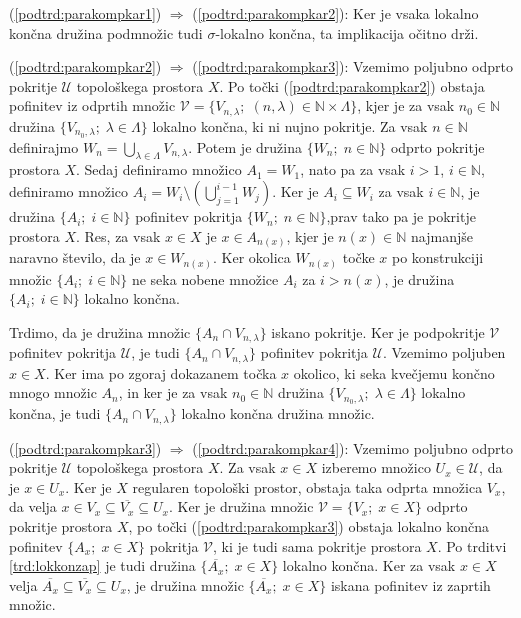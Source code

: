 \documentclass[mat1]{fmfdelo}
\newcommand{\N}{\mathbb N}
\newcommand{\Ucurl}{\mathcal{U}}
\newcommand{\closure}[1]{\overline{#1}}
\begin{document}
\begin{dokaz}
(\ref{podtrd:parakompkar1}) $\Rightarrow$ (\ref{podtrd:parakompkar2}):
Ker je vsaka lokalno končna družina podmnožic tudi $\sigma$-lokalno končna, ta implikacija očitno drži.

(\ref{podtrd:parakompkar2}) $\Rightarrow$ (\ref{podtrd:parakompkar3}):
Vzemimo poljubno odprto pokritje $\Ucurl$ topološkega prostora $X$. Po točki (\ref{podtrd:parakompkar2}) obstaja pofinitev iz odprtih množic $\mathcal{V} = \lbrace V_{n,\lambda} ;\; (n, \lambda) \in \N \times \Lambda \rbrace$, kjer je za vsak $n_0 \in \N$ družina $\lbrace V_{n_0, \lambda} ;\; \lambda \in \Lambda\rbrace$ lokalno končna, ki ni nujno pokritje. Za vsak $n \in \N$ definirajmo $W_n = \bigcup_{\lambda \in \Lambda} V_{n, \lambda}$. Potem je družina $\lbrace W_n ;\; n \in \N \rbrace$ odprto pokritje prostora $X$. Sedaj definiramo množico $A_1 = W_1$, nato pa za vsak $i > 1$, $i \in \N$, definiramo množico $A_i = W_i \setminus (\bigcup_{j=1}^{i-1}W_j)$. Ker je $A_i \subseteq W_i$ za vsak $i \in \N$, je družina $\lbrace A_i ;\; i \in \N \rbrace$ pofinitev pokritja $\lbrace W_n ;\; n \in \N \rbrace$,prav tako pa je pokritje prostora $X$. Res, za vsak $x \in X$ je $x \in A_{n(x)}$, kjer je $n(x) \in \N$ najmanjše naravno število, da je $x \in W_{n(x)}$. Ker okolica $W_{n(x)}$ točke $x$ po konstrukciji množic $\lbrace A_i ;\; i \in \N\rbrace$ ne seka nobene množice $A_i$ za $i > n(x)$, je družina $\lbrace A_i ;\; i \in \N \rbrace$ lokalno končna.

Trdimo, da je družina množic $\lbrace A_n \cap V_{n, \lambda}\rbrace$ iskano pokritje. Ker je podpokritje $\mathcal{V}$ pofinitev pokritja $\Ucurl$, je tudi $\lbrace A_n \cap V_{n, \lambda}\rbrace$ pofinitev pokritja $\Ucurl$. Vzemimo poljuben $x \in X$. Ker ima po zgoraj dokazanem točka $x$ okolico, ki seka kvečjemu končno mnogo množic $A_n$, in ker je za vsak $n_0 \in \N$ družina $\lbrace V_{n_0, \lambda} ;\; \lambda \in \Lambda \rbrace$ lokalno končna, je tudi $\lbrace A_n \cap V_{n, \lambda}\rbrace$ lokalno končna družina množic.

(\ref{podtrd:parakompkar3}) $\Rightarrow$ (\ref{podtrd:parakompkar4}):
Vzemimo poljubno odprto pokritje $\Ucurl$ topološkega prostora $X$. Za vsak $x \in X$ izberemo množico $U_x \in \Ucurl$, da je $x \in U_x$. Ker je $X$ regularen topološki prostor, obstaja taka odprta množica $V_x$, da velja $x \in V_x \subseteq \closure{V_x} \subseteq U_x$. Ker je družina množic $\mathcal{V} = \lbrace V_x ;\; x \in X \rbrace$ odprto pokritje prostora $X$, po točki (\ref{podtrd:parakompkar3}) obstaja lokalno končna pofinitev $\lbrace A_x ;\; x \in X \rbrace$ pokritja $\mathcal{V}$, ki je tudi sama pokritje prostora $X$. Po trditvi \ref{trd:lokkonzap} je tudi družina $\lbrace \closure{A_x} ;\; x \in X \rbrace$ lokalno končna. Ker za vsak $x \in X$ velja $\closure{A_x} \subseteq \closure{V_x} \subseteq U_x$, je družina množic $\lbrace \closure{A_x} ;\; x \in X \rbrace$ iskana pofinitev iz zaprtih množic.


\end{dokaz}
\end{document}
